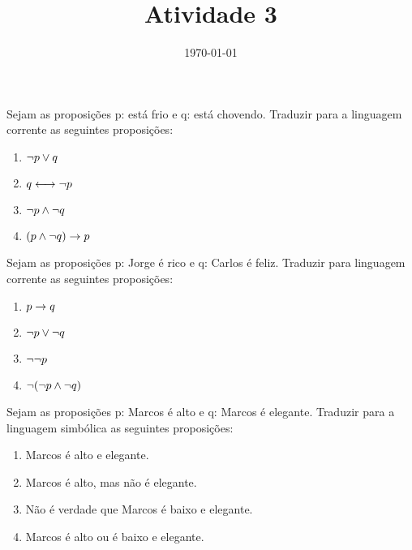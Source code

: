 \documentclass[a4paper, 11pt]{article}
\date{\today}
\title{Atividade 3}
\begin{document}
    \normalfont
    \header{}

    \begin{question}
        Sejam as proposições p: está frio e q: está chovendo. Traduzir para a linguagem corrente as seguintes proposições:
        \vspace{-3mm}
        \begin{enumerate}[itemsep=-1mm]
            \item $\lnot p \lor q$
            \item $q \longleftrightarrow \lnot p$
            \item $\lnot p \land \lnot q$
            \item $(p \land \lnot q) \rightarrow p$
        \end{enumerate}
    \end{question}

    \begin{question}
        Sejam as proposições p: Jorge é rico e q: Carlos é feliz. Traduzir para linguagem corrente as seguintes proposições:
        \vspace{-3mm}
        \begin{enumerate}[itemsep=-1mm]
            \item $p \rightarrow q$
            \item $\lnot p \lor \lnot q$
            \item $\lnot \lnot p$
            \item $\lnot (\lnot p \land \lnot q)$
        \end{enumerate}
    \end{question}

    \begin{question}
        Sejam as proposições p: Marcos é alto e q: Marcos é elegante. Traduzir para a linguagem simbólica as seguintes proposições:
        \vspace{-3mm}
        \begin{enumerate}[itemsep=-1mm]
            \item Marcos é alto e elegante.
            \item Marcos é alto, mas não é elegante.
            \item Não é verdade que Marcos é baixo e elegante.
            \item Marcos é alto ou é baixo e elegante.
        \end{enumerate}
    \end{question}
    
\end{document}
